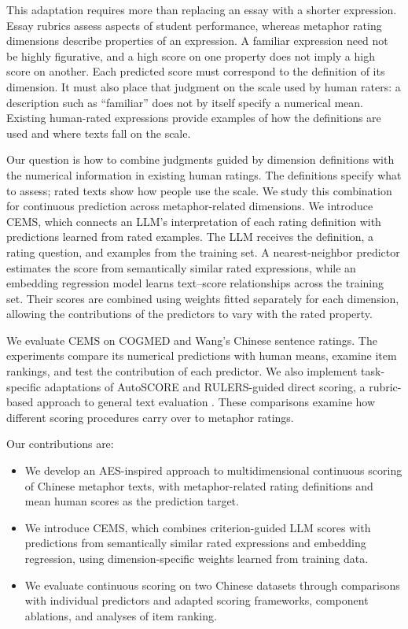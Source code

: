 This adaptation requires more than replacing an essay with a shorter expression. Essay rubrics assess aspects of student performance, whereas metaphor rating dimensions describe properties of an expression. A familiar expression need not be highly figurative, and a high score on one property does not imply a high score on another. Each predicted score must correspond to the definition of its dimension. It must also place that judgment on the scale used by human raters: a description such as ``familiar'' does not by itself specify a numerical mean. Existing human-rated expressions provide examples of how the definitions are used and where texts fall on the scale.

Our question is how to combine judgments guided by dimension definitions with the numerical information in existing human ratings. The definitions specify what to assess; rated texts show how people use the scale. We study this combination for continuous prediction across metaphor-related dimensions. We introduce CEMS, which connects an LLM's interpretation of each rating definition with predictions learned from rated examples. The LLM receives the definition, a rating question, and examples from the training set. A nearest-neighbor predictor estimates the score from semantically similar rated expressions, while an embedding regression model learns text--score relationships across the training set. Their scores are combined using weights fitted separately for each dimension, allowing the contributions of the predictors to vary with the rated property.

We evaluate CEMS on COGMED and Wang's Chinese sentence ratings. The experiments compare its numerical predictions with human means, examine item rankings, and test the contribution of each predictor. We also implement task-specific adaptations of AutoSCORE and RULERS-guided direct scoring, a rubric-based approach to general text evaluation \citep{hong2026rulers}. These comparisons examine how different scoring procedures carry over to metaphor ratings. 

Our contributions are:
\begin{itemize}[leftmargin=*,nosep]
    \item We develop an AES-inspired approach to multidimensional continuous scoring of Chinese metaphor texts, with metaphor-related rating definitions and mean human scores as the prediction target.
    \item We introduce CEMS, which combines criterion-guided LLM scores with predictions from semantically similar rated expressions and embedding regression, using dimension-specific weights learned from training data.
    \item We evaluate continuous scoring on two Chinese datasets through comparisons with individual predictors and adapted scoring frameworks, component ablations, and analyses of item ranking.
\end{itemize}



